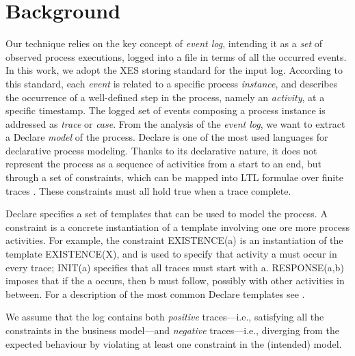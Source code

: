 \section{Background}%
\label{sec:back}

Our technique relies on the key concept of \emph{event log}, intending it as a \emph{set} of observed process executions, logged into a file in terms of all the occurred events.
%
%
In this work, we adopt the \ac{XES} storing standard \cite{XES} for the input log. According to this standard, each \emph{event} is related to a specific process \emph{instance}, and describes the occurrence of a well-defined step in the process, namely an \emph{activity}, at a specific timestamp. The logged set of events composing a process instance is addressed as \emph{trace} or \emph{case}. 
From the analysis of the \emph{event log}, we want to extract a Declare \cite{2008-Pesic,2009-Aalst} \emph{model} of the process.
Declare is one of the most used languages for declarative process modeling. Thanks to its declarative nature, it does not represent the process as a sequence of activities from a start to an end, but through a set of constraints, which can be mapped into \ac{LTL} formulae over finite traces \cite{DBLP:journals/tweb/MontaliPACMS10,DBLP:conf/ijcai/GiacomoV13}. These constraints must all hold true when a trace complete.

Declare specifies a set of templates that can be used to model the process. 
A constraint is a concrete instantiation of a template involving one ore more process activities.
For example, the constraint \textsf{EXISTENCE(a)} is an instantiation of the template \textsf{EXISTENCE(X)}, and is used to specify that activity \textsf{a} must occur in every trace; \textsf{INIT(a)} specifies that all traces must start with \textsf{a}. \textsf{RESPONSE(a,b)} imposes that if the \textsf{a} occurs, then \textsf{b} must follow, possibly with other activities in between. %
For a description of the most common Declare templates see \cite{2008-Pesic}. 

We assume that the log contains both \emph{positive} traces---i.e., satisfying all the constraints in the business model---and \emph{negative} traces---i.e., diverging from the expected behaviour by violating at least one constraint in the (intended) model. 



